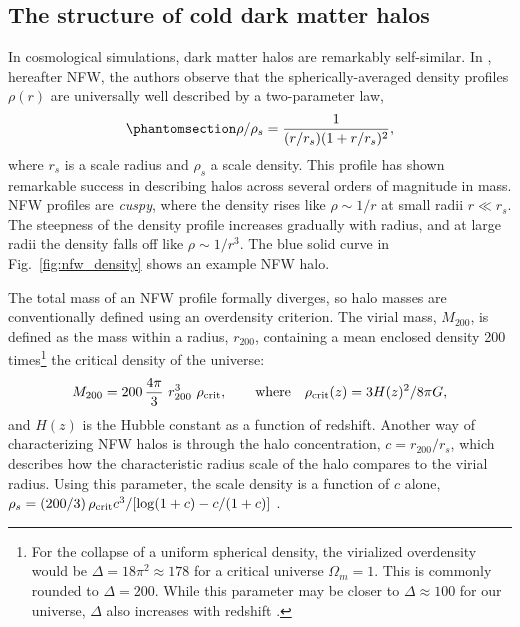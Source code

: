 \subsection{The structure of cold dark matter
halos}\label{the-structure-of-cold-dark-matter-halos}

In \LCDM{} cosmological simulations, dark matter halos are remarkably
self-similar. In \citet{NFW1996, NFW1997}, hereafter NFW, the authors
observe that the spherically-averaged density profiles \(\rho(r)\) are
universally well described by a two-parameter law,
\begin{equation}\protect\phantomsection\label{eq:nfw}{
\rho/\rho_s= \frac{1}{(r/r_s)(1+r/r_s)^2},
}\end{equation} where \(r_s\) is a scale radius and \(\rho_s\) a scale
density. This profile has shown remarkable success in describing \LCDM{}
halos across several orders of magnitude in mass. NFW profiles are
\emph{cuspy}, where the density rises like \(\rho \sim 1/r\) at small
radii \(r \ll r_s\). The steepness of the density profile increases
gradually with radius, and at large radii the density falls off like
\(\rho \sim 1/r^3\). The blue solid curve in Fig.~\ref{fig:nfw_density}
shows an example NFW halo.

The total mass of an NFW profile formally diverges, so halo masses are
conventionally defined using an overdensity criterion. The virial mass,
\(M_{200}\), is defined as the mass within a radius, \(r_{200}\),
containing a mean enclosed density 200 times\footnote{For the collapse
  of a uniform spherical density, the virialized overdensity would be
  \(\Delta = 18\pi^2\approx 178\) for a critical universe
  \(\Omega_m = 1\). This is commonly rounded to \(\Delta = 200\). While
  this parameter may be closer to \(\Delta \approx 100\) for our
  universe, \(\Delta\) also increases with redshift \citep[using eq. 6
  from][]{bryan+norman1998}.} the critical density of the universe:
\begin{equation}{
M_{200} =200\,\frac{4\pi}{3} \ r_{200}^3\ \rho_{\rm crit}, \qquad {\rm where} \quad \rho_{\rm crit}(z) = 3H(z)^2 / 8\pi G,
}\end{equation} and \(H(z)\) is the Hubble constant as a function of
redshift. Another way of characterizing NFW halos is through the halo
concentration, \(c=r_{200} / r_s\), which describes how the
characteristic radius scale of the halo compares to the virial radius.
Using this parameter, the scale density is a function of \(c\) alone,
\(\rho_s = (200/3)\,\rho_{\rm crit} c^3 / [\log(1+c) - c/(1+c)]\)
\citep{NFW1996}.

